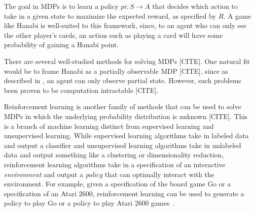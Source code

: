 The goal in MDPs is to learn a policy $pi : S \to A$ that decides which action
to take in a given state to maximize the expected reward, as specified by $R$.
A game like Hanabi is well-suited to this framework, since, to an agent who can
only see the other player's cards, an action such as playing a card will have
some probability of gaining a Hanabi point.

There are several well-studied methods for solving MDPs [CITE]. One natural fit
would be to frame Hanabi as a partially observable MDP [CITE], since as
described in , an agent can only observe partial
state. However, such problems been proven to be computation intractable [CITE].

Reinforcement learning is another family of methods that can be used to solve
MDPs in which the underlying probability distribution is unknown [CITE]. This
is a branch of machine learning distinct from supervised learning and
unsupervised learning. While supervised learning algorithms take in labeled
data and output a classifier and unsupervised learning algorithms take in
unlabeled data and output something like a clustering or dimensionality
reduction, reinforcement learning algorithms take in a specification of an
interactive \emph{environment} and output a \emph{policy} that can optimally
interact with the environment. For example, given a specification of the board
game Go or a specification of an Atari 2600, reinforcement learning can be used
to generate a policy to play Go or a policy to play Atari 2600
games~\cite{silver2016mastering,mnih2015human}.
